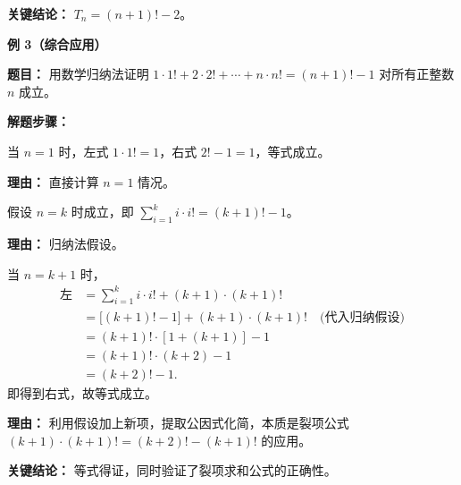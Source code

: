 \begin{examplebox}
	\textbf{\textcolor{CExample}{关键结论：}}
	$T_n = (n+1)! - 2$。

	\medskip
	\textbf{\textcolor{CExample}{例 3（综合应用）}}

	\textbf{\textcolor{CExample}{题目：}}
	用数学归纳法证明 $1\cdot1!+2\cdot2!+\cdots+n\cdot n! = (n+1)! - 1$ 对所有正整数 $n$ 成立。

	\textbf{\textcolor{CExample}{解题步骤：}}
	\begin{description}[style=nextline, leftmargin=2.8em, labelsep=0.5em, itemsep=0.45em]
		\item[\textbf{第一步（基础验证）：}] 当 $n=1$ 时，左式 $1\cdot1! = 1$，右式 $2!-1 = 1$，等式成立。
			\par\textbf{理由：} 直接计算 $n=1$ 情况。
		\item[\textbf{第二步（归纳假设）：}] 假设 $n=k$ 时成立，即 $\sum_{i=1}^{k} i\cdot i! = (k+1)! - 1$。
			\par\textbf{理由：} 归纳法假设。
		\item[\textbf{第三步（归纳递推）：}] 当 $n=k+1$ 时，
			\[
				\begin{aligned}
					\text{左} &= \sum_{i=1}^{k} i\cdot i! + (k+1)\cdot(k+1)! \\
					&= \bigl[(k+1)! - 1\bigr] + (k+1)\cdot(k+1)! \quad\text{(代入归纳假设)}\\
					&= (k+1)! \cdot [1 + (k+1)] - 1 \\
					&= (k+1)! \cdot (k+2) - 1 \\
					&= (k+2)! - 1.
			\end{aligned}
			\]
			即得到右式，故等式成立。
			\par\textbf{理由：} 利用假设加上新项，提取公因式化简，本质是裂项公式 $ (k+1)\cdot(k+1)! = (k+2)! - (k+1)!$ 的应用。
	\end{description}

	\textbf{\textcolor{CExample}{关键结论：}}
	等式得证，同时验证了裂项求和公式的正确性。

\end{examplebox}
